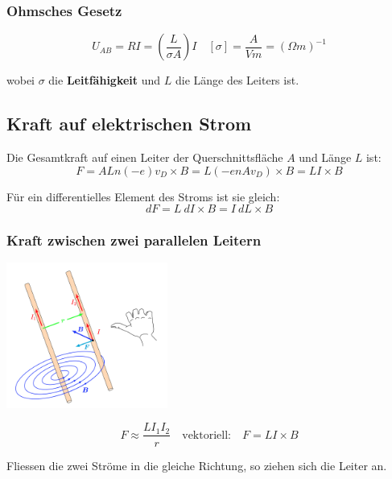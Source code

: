 \documentclass[7pt]{article}
\begin{document}
\begin{multicols*}{3}
\subsubsection{Ohmsches Gesetz}

\begin{equation*}
	U_{AB} = RI = (\frac{L}{\sigma A})I \quad [\sigma] = \frac{A}{Vm} = (\Omega m)^{-1}
\end{equation*}

wobei $\sigma$ die \textbf{Leitf{\"a}higkeit} und $L$ die L{\"a}nge des Leiters ist.

\subsection{Kraft auf elektrischen Strom}

Die Gesamtkraft auf einen Leiter der Querschnittsfl{\"a}che $A$ und L{\"a}nge $L$ ist:
\begin{equation*}
	F = ALn(-e)v_D \times B = L(-enAv_D)\times B = LI \times B
\end{equation*}

F{\"u}r ein differentielles Element des Stroms ist sie gleich:
\begin{equation*}
	dF = L\ dI \times B = I\ dL\times B
\end{equation*}

\subsubsection{Kraft zwischen zwei parallelen Leitern}

\begin{center}
	\includegraphics[width=150pt]{images/parallele_leiter}
\end{center}

\begin{equation*}
	F \approx \frac{LI_1I_2}{r} \quad \text{vektoriell:}\quad F = LI \times B
\end{equation*}

Fliessen die zwei Str{\"o}me in die gleiche Richtung, so ziehen sich die Leiter an.


\end{multicols*}
\end{document}
